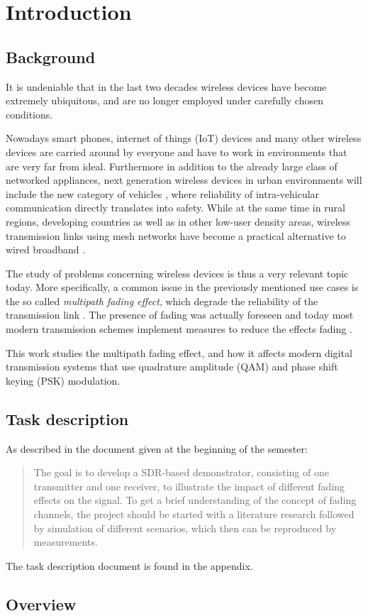 
\chapter{Introduction}

\section{Background}

It is undeniable that in the last two decades wireless devices have become extremely ubiquitous, and are no longer employed under carefully chosen conditions.

Nowadays smart phones, internet of things (IoT) devices and many other wireless devices are carried around by everyone and have to work in environments that are very far from ideal. Furthermore in addition to the already large class of networked appliances, next generation wireless devices in urban environments will include the new category of vehicles \cite{AntonescuTB17}, where reliability of intra-vehicular communication directly translates into safety. While at the same time in rural regions, developing countries as well as in other low-user density areas, wireless transmission links using mesh networks have become a practical alternative to wired broadband \cite{Macmillan2019tidal,Subramanian2006rethinking,Flickenger2007wireless}.

The study of problems concerning wireless devices is thus a very relevant topic today. More specifically, a common issue in the previously mentioned use cases is the so called \emph{multipath fading effect}, which degrade the reliability of the transmission link \cite{Mathis, Gallager}. The presence of fading was actually foreseen \cite{Frederiksen2002overview,Maddocks1993introduction} and today most modern transmission schemes implement measures to reduce the effects fading \cite{Mathis,Hsu}.

This work studies the multipath fading effect, and how it affects modern digital transmission systems that use quadrature amplitude (QAM) and phase shift keying (PSK) modulation.

\section{Task description}

As described in the document given at the beginning of the semester:
\begin{quote}
	The goal is to develop a SDR-based demonstrator, consisting of one transmitter and one receiver, to illustrate the impact of different fading effects on the signal. To get a brief understanding of the concept of fading channels, the project should be started with a literature research followed by simulation of different scenarios, which then can be reproduced by measurements.
\end{quote}
The task description document is found in the appendix.

\section{Overview}

